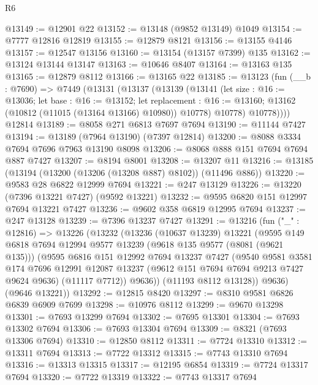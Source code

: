 \begin{lexlean}{R6}
\begin{coremodule}
@13149 := @12901 @22
@13152 := @13148 (@9852 @13149) @1049
@13154 := @7777 @12816 @12819
@13155 := @12879 @8121
@13156 := @13155 @4146
@13157 := @12547 @13156
@13160 := @13154 (@13157 @7399) @135
@13162 := @13124 @13144 @13147
@13163 := @10646 @8407
@13164 := @13163 @135
@13165 := @12879 @8112
@13166 := @13165 @22
@13185 := @13123
    (fun (__b : @7690) =>
    @7449
      (@13131
        (@13137
          (@13139
            (@13141
              (let size : @16 := @13036;
              let base : @16 := @13152;
              let replacement : @16 := @13160;
              @13162 (@10812 (@11015 (@13164 @13166) @10980)) @10778)
              @10778)
            @10778))))
    @12814
@13189 := @8058 @271 @6813 @7697 @7694
@13190 := @11144 @7427
@13194 := @13189 (@7964 @13190) (@7397 @12814)
@13200 := @8088 @3334 @7694 @7696 @7963 @13190 @8098
@13206 := @8068 @888 @151 @7694 @7694 @887 @7427
@13207 := @8194 @8001
@13208 := @13207 @11
@13216 := @13185 (@13194 (@13200 (@13206 (@13208 @887) @8102)) (@11496 @886))
@13220 := @9583 @28 @6822 @12999 @7694
@13221 := @247 @13129
@13226 := @13220 (@7396 @13221 @7427) (@9592 @13221)
@13232 := @9595 @6820 @151 @12997 @7694 @13221 @7427
@13236 := @9602 @358 @6819 @12995 @7694
@13237 := @247 @13128
@13239 := @7396 @13237 @7427
@13291 := @13216
    (fun ("_" : @12816) =>
    @13226
      (@13232
        (@13236
          (@10637 @13239)
          @13221
          (@9595
            @149
            @6818
            @7694
            @12994
            @9577
            @13239
            (@9618 @135 @9577 (@8081 (@9621 @135)))
            (@9595
              @6816
              @151
              @12992
              @7694
              @13237
              @7427
              (@9540
                @9581
                @3581
                @174
                @7696
                @12991
                @12087
                @13237
                (@9612 @151 @7694 @7694 @9213 @7427 @9624 @9636)
                (@11117 @7712))
              @9636))
          (@11193 @8112 @13128))
        @9636)
      (@9646 @13221))
@13292 := @12815 @8420
@13297 := @8310 @9581 @6826 @6839 @6909 @7699
@13298 := @10976 @8112
@13299 := @9670 @13298
@13301 := @7693 @13299 @7694
@13302 := @7695 @13301
@13304 := @7693 @13302 @7694
@13306 := @7693 @13304 @7694
@13309 := @8321 (@7693 @13306 @7694)
@13310 := @12850 @8112
@13311 := @7724 @13310
@13312 := @13311 @7694
@13313 := @7722 @13312
@13315 := @7743 @13310 @7694
@13316 := @13313 @13315
@13317 := @12195 @6854
@13319 := @7724 @13317 @7694
@13320 := @7722 @13319
@13322 := @7743 @13317 @7694

\end{coremodule}
\end{lexlean}
